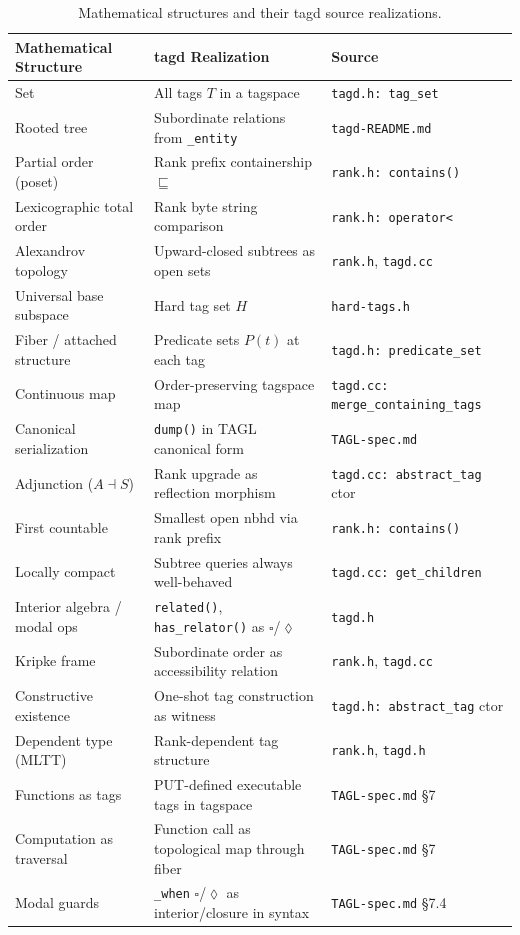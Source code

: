 \documentclass{article}
\begin{document}
\begin{table}[h]
\centering
\small
\begin{tabular}{lll}
\toprule
\textbf{Mathematical Structure} & \textbf{tagd Realization} & \textbf{Source} \\
\midrule
Set & All tags $T$ in a tagspace & \texttt{tagd.h: tag\_set} \\
Rooted tree & Subordinate relations from \texttt{\_entity} & \texttt{tagd-README.md} \\
Partial order (poset) & Rank prefix containership $\sqsubseteq$ & \texttt{rank.h: contains()} \\
Lexicographic total order & Rank byte string comparison & \texttt{rank.h: operator<} \\
Alexandrov topology & Upward-closed subtrees as open sets & \texttt{rank.h}, \texttt{tagd.cc} \\
Universal base subspace & Hard tag set $H$ & \texttt{hard-tags.h} \\
Fiber / attached structure & Predicate sets $P(t)$ at each tag & \texttt{tagd.h: predicate\_set} \\
Continuous map & Order-preserving tagspace map & \texttt{tagd.cc: merge\_containing\_tags} \\
Canonical serialization & \texttt{dump()} in TAGL canonical form & \texttt{TAGL-spec.md} \\
Adjunction ($A \dashv S$) & Rank upgrade as reflection morphism & \texttt{tagd.cc: abstract\_tag} ctor \\
First countable & Smallest open nbhd via rank prefix & \texttt{rank.h: contains()} \\
Locally compact & Subtree queries always well-behaved & \texttt{tagd.cc: get\_children} \\
Interior algebra / modal ops & \texttt{related()}, \texttt{has\_relator()} as $\square$/$\lozenge$ & \texttt{tagd.h} \\
Kripke frame & Subordinate order as accessibility relation & \texttt{rank.h}, \texttt{tagd.cc} \\
Constructive existence & One-shot tag construction as witness & \texttt{tagd.h: abstract\_tag} ctor \\
Dependent type (MLTT) & Rank-dependent tag structure & \texttt{rank.h}, \texttt{tagd.h} \\
Functions as tags & PUT-defined executable tags in tagspace & \texttt{TAGL-spec.md} \S7 \\
Computation as traversal & Function call as topological map through fiber & \texttt{TAGL-spec.md} \S7 \\
Modal guards & \texttt{\_when} $\square$/$\lozenge$ as interior/closure in syntax & \texttt{TAGL-spec.md} \S7.4 \\
\bottomrule
\end{tabular}
\caption{Mathematical structures and their tagd source realizations.}
\label{tab:summary}
\end{table}
\end{document}
